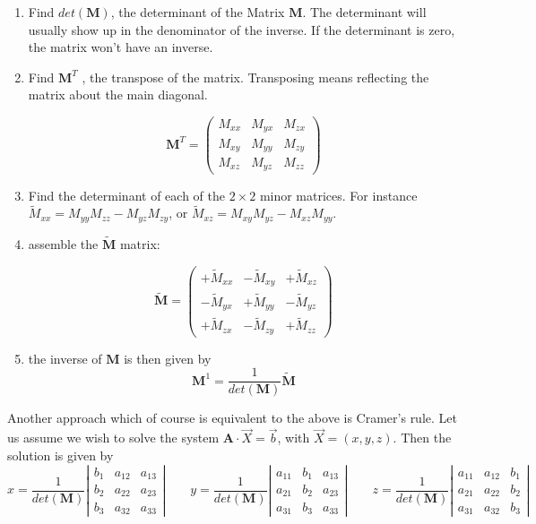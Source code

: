 \begin{enumerate}
\item
Find $det({\bm M})$, the determinant of the Matrix ${\bm M}$.
The determinant will usually show up in the denominator of the inverse. 
If the determinant is zero, the matrix won't have an inverse.

\item  Find ${\bm M}^T$ , the transpose of the matrix. Transposing means reflecting 
the matrix about the main diagonal.

\[
{\bm M}^T=
\left(
\begin{array}{ccc}
M_{xx} & M_{yx} & M_{zx} \\
M_{xy} & M_{yy} & M_{zy} \\
M_{xz} & M_{yz} & M_{zz} 
\end{array}
\right)
\]

\item  Find the determinant of each of the $2\times2$ 
minor matrices. For instance $\tilde{M}_{xx}=M_{yy}M_{zz}-M_{yz}M_{zy}$,
or $\tilde{M}_{xz}=M_{xy}M_{yz}- M_{xz}M_{yy}$.

\item assemble the $\tilde{\bm M}$ matrix:

\[
\tilde{\bm M}=
\left(
\begin{array}{ccc}
+\tilde{M}_{xx} & -\tilde{M}_{xy} & +\tilde{M}_{xz} \\
-\tilde{M}_{yx} & +\tilde{M}_{yy} & -\tilde{M}_{yz} \\
+\tilde{M}_{zx} & -\tilde{M}_{zy} & +\tilde{M}_{zz} 
\end{array}
\right)
\]

\item the inverse of ${\bm M}$ is then given by
\[
{\bm M}^{1} = \frac{1}{det({\bm M})} \tilde{\bm M}
\]

\end{enumerate}

Another approach which of course is equivalent to the above is Cramer's rule. 
Let us assume we wish to solve the 
system $\bm A \cdot \vec X = \vec b$, with $\vec X=(x,y,z)$. Then the solution is given by
\[
x=
\frac{1}{det(\bm M)}
\left| 
\begin{array}{ccc}
b_1 & a_{12} & a_{13} \\
b_2 & a_{22} & a_{23} \\
b_3 & a_{32} & a_{33}
\end{array}
\right|
\qquad
y=
\frac{1}{det(\bm M)}
\left| 
\begin{array}{ccc}
a_{11} & b_1 & a_{13} \\
a_{21} & b_2 & a_{23} \\
a_{31} & b_3 & a_{33} 
\end{array}
\right|
\qquad
z=
\frac{1}{det(\bm M)}
\left| 
\begin{array}{ccc}
a_{11} & a_{12} & b_1\\
a_{21} & a_{22} & b_2\\
a_{31} & a_{32} & b_3
\end{array}
\right|
\]



